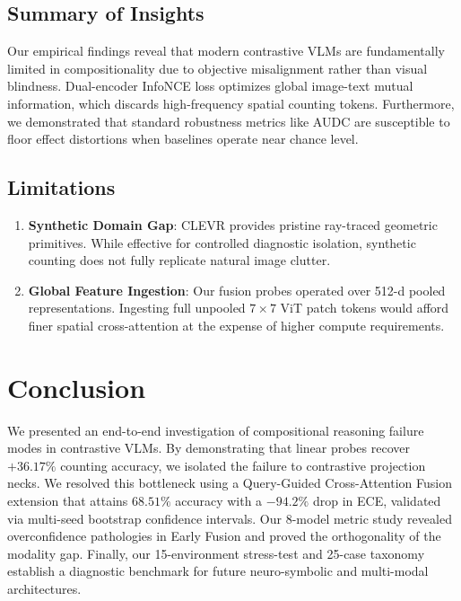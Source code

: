 \documentclass[conference]{IEEEtran}
\begin{document}
\subsection{Summary of Insights}
Our empirical findings reveal that modern contrastive VLMs are fundamentally limited in compositionality due to objective misalignment rather than visual blindness. Dual-encoder InfoNCE loss optimizes global image-text mutual information, which discards high-frequency spatial counting tokens. Furthermore, we demonstrated that standard robustness metrics like AUDC are susceptible to floor effect distortions when baselines operate near chance level.

\subsection{Limitations}
\begin{enumerate}
    \item \textbf{Synthetic Domain Gap}: CLEVR provides pristine ray-traced geometric primitives. While effective for controlled diagnostic isolation, synthetic counting does not fully replicate natural image clutter.
    \item \textbf{Global Feature Ingestion}: Our fusion probes operated over 512-d pooled representations. Ingesting full unpooled $7\times 7$ ViT patch tokens would afford finer spatial cross-attention at the expense of higher compute requirements.
\end{enumerate}

\section{Conclusion}
\label{sec:conclusion}
We presented an end-to-end investigation of compositional reasoning failure modes in contrastive VLMs. By demonstrating that linear probes recover $+36.17\%$ counting accuracy, we isolated the failure to contrastive projection necks. We resolved this bottleneck using a Query-Guided Cross-Attention Fusion extension that attains $68.51\%$ accuracy with a $-94.2\%$ drop in ECE, validated via multi-seed bootstrap confidence intervals. Our 8-model metric study revealed overconfidence pathologies in Early Fusion and proved the orthogonality of the modality gap. Finally, our 15-environment stress-test and 25-case taxonomy establish a diagnostic benchmark for future neuro-symbolic and multi-modal architectures.
\end{document}
